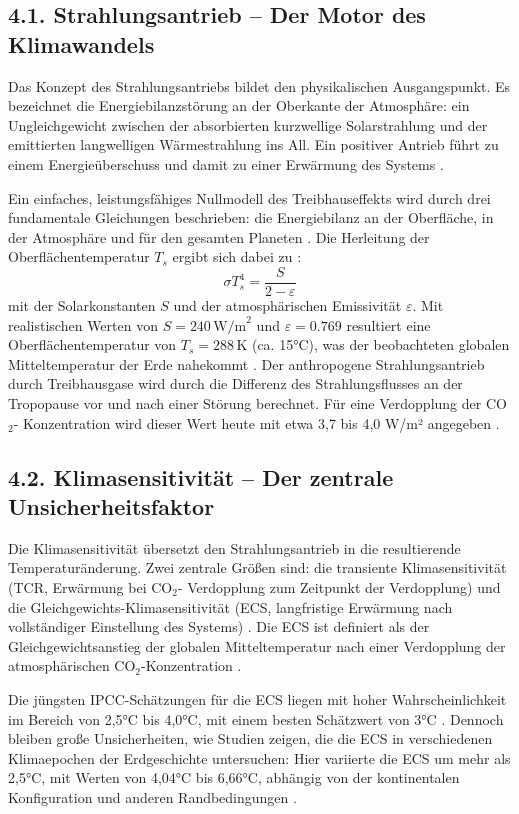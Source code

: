 \documentclass[12pt, a4paper]{article}
\begin{document}
	\subsection*{4.1. Strahlungsantrieb – Der Motor des Klimawandels}
	Das Konzept des Strahlungsantriebs bildet den physikalischen Ausgangspunkt. Es bezeichnet
	die Energiebilanzstörung an der Oberkante der Atmosphäre: ein Ungleichgewicht zwischen der
	absorbierten kurzwellige Solarstrahlung und der emittierten langwelligen Wärmestrahlung
	ins All. Ein positiver Antrieb führt zu einem Energieüberschuss und damit zu einer
	Erwärmung des Systems \cite{open2025}.
	
	Ein einfaches, leistungsfähiges Nullmodell des Treibhauseffekts wird durch drei fundamentale
	Gleichungen beschrieben: die Energiebilanz an der Oberfläche, in der Atmosphäre und für den
	gesamten Planeten \cite{realclimate2007}. Die Herleitung der Oberflächentemperatur \(T_s\)
	ergibt sich dabei zu \cite{realclimate2007}:
	\[
	\sigma T_s^4 = \frac{S}{2 - \varepsilon}
	\]
	mit der Solarkonstanten \(S\) und der atmosphärischen Emissivität \(\varepsilon\). Mit
	realistischen Werten von \(S = 240 \, \text{W/m}^2\) und \(\varepsilon = 0.769\) resultiert
	eine Oberflächentemperatur von \(T_s = 288 \, \text{K}\) (ca. 15°C), was der beobachteten
	globalen Mitteltemperatur der Erde nahekommt \cite{realclimate2007}. Der anthropogene
	Strahlungsantrieb durch Treibhausgase wird durch die Differenz des Strahlungsflusses an
	der Tropopause vor und nach einer Störung berechnet. Für eine Verdopplung der CO$_2$-
	Konzentration wird dieser Wert heute mit etwa 3,7 bis 4,0 W/m² angegeben \cite{ipcc2021}.
	
	\subsection*{4.2. Klimasensitivität – Der zentrale Unsicherheitsfaktor}
	Die Klimasensitivität übersetzt den Strahlungsantrieb in die resultierende Temperaturänderung.
	Zwei zentrale Größen sind: die transiente Klimasensitivität (TCR, Erwärmung bei CO$_2$-
	Verdopplung zum Zeitpunkt der Verdopplung) und die Gleichgewichts-Klimasensitivität (ECS,
	langfristige Erwärmung nach vollständiger Einstellung des Systems) \cite{ipcc2021}. Die ECS
	ist definiert als der Gleichgewichtsanstieg der globalen Mitteltemperatur nach einer
	Verdopplung der atmosphärischen CO$_2$-Konzentration \cite{springer2026}.
	
	Die jüngsten IPCC-Schätzungen für die ECS liegen mit hoher Wahrscheinlichkeit im Bereich
	von 2,5°C bis 4,0°C, mit einem besten Schätzwert von 3°C \cite{ipcc2021, springer2024}.
	Dennoch bleiben große Unsicherheiten, wie Studien zeigen, die die ECS in verschiedenen
	Klimaepochen der Erdgeschichte untersuchen: Hier variierte die ECS um mehr als 2,5°C,
	mit Werten von 4,04°C bis 6,66°C, abhängig von der kontinentalen Konfiguration und
	anderen Randbedingungen \cite{springer2026}.
	
\end{document}
